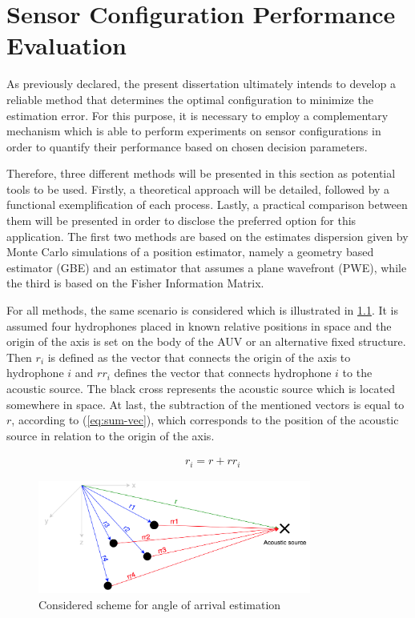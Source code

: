 \chapter{Sensor Configuration Performance Evaluation} \label{chap:proposed_sys}

As previously declared, the present dissertation ultimately intends to develop a reliable method that determines the optimal configuration to minimize the estimation error. For this purpose, it is necessary to employ a complementary mechanism which is able to perform experiments on sensor configurations in order to quantify their performance based on chosen decision parameters.

Therefore, three different methods will be presented in this section as potential tools to be used. Firstly, a theoretical approach will be detailed, followed by a functional exemplification of each process. Lastly, a practical comparison between them will be presented in order to disclose the preferred option for this application. The first two methods are based on the estimates dispersion given by Monte Carlo simulations of a position estimator, namely a geometry based estimator (GBE) and an estimator that assumes a plane wavefront (PWE), while the third is based on the Fisher Information Matrix.

For all methods, the same scenario is considered which is illustrated in \ref{fig:AoA-init}. It is assumed four hydrophones placed in known relative positions in space and the origin of the axis is set on the body of the AUV or an alternative fixed structure. Then $r_i$ is defined as the vector that connects the origin of the axis to hydrophone $i$ and $rr_i$ defines the vector that connects hydrophone $i$ to the acoustic source. The black cross represents the acoustic source which is located somewhere in space. At last, the subtraction of the mentioned vectors is equal to $r$, according to (\ref{eq:sum-vec}), which corresponds to the position of the acoustic source in relation to the origin of the axis.

\begin{eqnarray}
	& r_i = r + rr_i
	\label{eq:sum-vec}
\end{eqnarray}

\begin{figure}[!htbp]
	\centering
	\includegraphics[width=0.8\textwidth]{figures/AoA-init}
	\captionsetup{justification=centering,margin=2cm}
	\caption{Considered scheme for angle of arrival estimation}
	\label{fig:AoA-init}
\end{figure}

